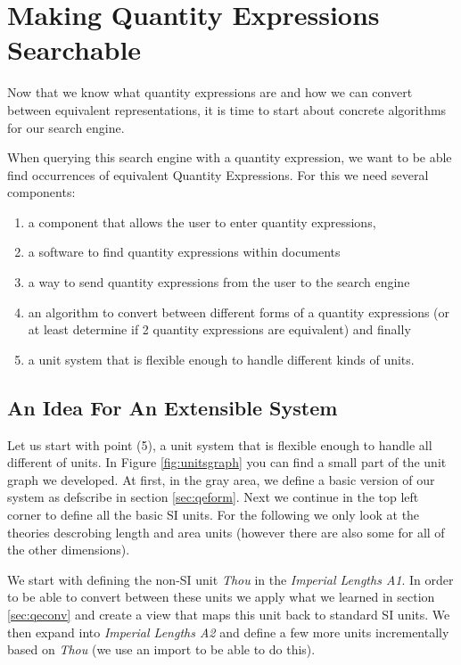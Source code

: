 \section{Making Quantity Expressions Searchable}
\label{sec:mqes}
Now that we know what quantity expressions are and how we can convert between equivalent representations, it is time to start about concrete algorithms for our search engine.

When querying this search engine with a quantity expression, we want to be able find occurrences of equivalent Quantity Expressions. For this we need several components:
\begin{enumerate}
  \item a component that allows the user to enter quantity expressions,
  \item a software to find quantity expressions within documents
  \item a way to send quantity expressions from the user to the search engine
  \item an algorithm to convert between different forms of a quantity expressions (or at least determine if 2 quantity expressions are equivalent) and finally
  \item a unit system that is flexible enough to handle different kinds of units.
\end{enumerate}

\subsection{An Idea For An Extensible System}
\label{sec:meq_model}

Let us start with point (5), a unit system that is flexible enough to handle all different of units. In Figure \ref{fig:unitsgraph} you can find a small part of the unit graph we developed. At first, in the gray area, we define a basic version of our system as defscribe in section \ref{sec:qeform}. Next we continue in the top left corner to define all the basic SI units. For the following we only look at the theories descrobing length and area units (however there are also some for all of the other dimensions).



We start with defining the non-SI unit \textit{Thou} in the \textit{Imperial Lengths A1}. In order to be able to convert between these units we apply what we learned in section \ref{sec:qeconv} and create a view that maps this unit back to standard SI units. We then expand into \textit{Imperial Lengths A2} and define a few more units incrementally based on \textit{Thou} (we use an import to be able to do this).

